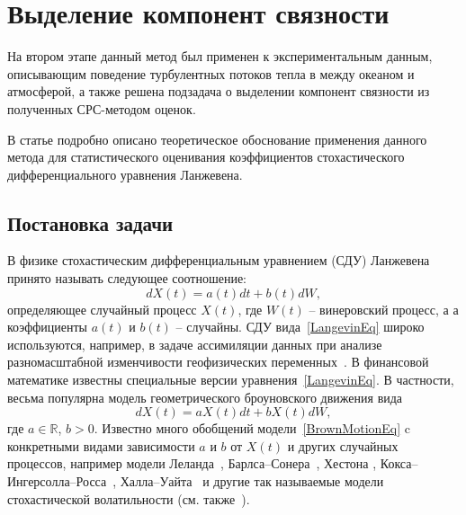 \documentclass[oneside,senior,etd]{BYUPhys}
\newcommand{\todo}[1]{\textcolor{red}{#1}}
\begin{document}
		
\section{Выделение компонент связности}
    На втором этапе данный метод был применен к экспериментальным данным, описывающим поведение турбулентных потоков тепла в между океаном и атмосферой, а также решена подзадача о выделении компонент связности из полученных СРС-методом оценок.
       
    В статье \cite{gorshenin2020stat} подробно описано теоретическое обоснование применения данного метода для статистического оценивания коэффициентов стохастического дифференциального уравнения Ланжевена.
	\subsection{Постановка задачи}
		В физике стохастическим дифференциальным уравнением (СДУ) Ланжевена принято называть следующее соотношение:
		\begin{equation}
		\label{LangevinEq}
		dX(t)=a(t)dt+b(t)dW,
		\end{equation}
		определяющее случайный процесс $X(t)$, где $W(t)$ -- винеровский процесс, а а коэффициенты $a(t)$ и $b(t)$ -- случайны. СДУ вида~\eqref{LangevinEq} широко используются, например, в задаче ассимиляции данных при анализе разномасштабной изменчивости геофизических переменных~\cite{belyaev2018optimal}. В финансовой математике известны специальные версии уравнения~\eqref{LangevinEq}. В частности, весьма популярна модель геометрического броуновского движения вида
		\begin{equation}
		\label{BrownMotionEq}
		dX(t)=aX(t)dt+b X(t)dW,
		\end{equation}
		где $a\in\mathbb{R}$, $b>0$. Известно много обобщений модели~\eqref{BrownMotionEq} c конкретными видами зависимости $a$ и $b$ от $X(t)$ и других случайных процессов, например модели Леланда~\cite{leland1985option}, Барлса--Сонера~\cite{barles1998option}, Хестона \cite{heston1993closed}, Кокса--Ингерсолла--Росса~\cite{cox2005theory}, Халла--Уайта~\cite{hull1987pricing} и другие так называемые модели стохастической волатильности (см. также~\cite{derman1994riding, dupire1994pricing, shiryaev2004}).
		
\end{document}
